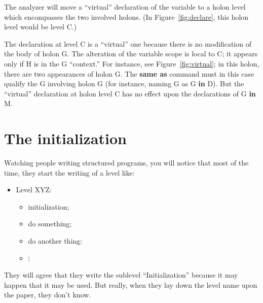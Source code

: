 \documentclass[openany,nobib]{tufte-book}
\newcommand{\kw}[1]{{\bf #1}}
\begin{document}
The analyzer will move a ``virtual'' declaration of the variable to a holon
level which encompasses the two involved holons. (In Figure~\ref{fig:declare},
this holon level would be level C.)

The declaration at level C is a ``virtual'' one because there is no
modification of the body of holon G. The alteration of the variable scope is
local to C; it appears only if H is in the G ``context.'' For instance, see
Figure~\ref{fig:virtual}; in this holon, there are two appearances of holon G.
The \kw{same as} command must in this case qualify the G involving holon G
(for instance, naming G as G \kw{in} D). But the ``virtual'' declaration at
holon level C has no effect upon the declarations of G \kw{in} M.

\begin{marginfigure}
\caption{A holon with a ``virtual'' declaration.}
\label{fig:virtual}
\end{marginfigure}

\section{The initialization}

Watching people writing structured programs, you will notice that most of the
time, they start the writing of a level like:
\begin{itemize}
    \item[] Level XYZ:
    \begin{itemize}
        \item[] initialization;
        \item[] do something;
        \item[] do another thing:
        \item[] $\vdots$
    \end{itemize}
\end{itemize}
They will agree that they write the sublevel ``Initialization'' because it may
happen that it may be used. But really, when they lay down the level name upon
the paper, they don't know.
\end{document}
